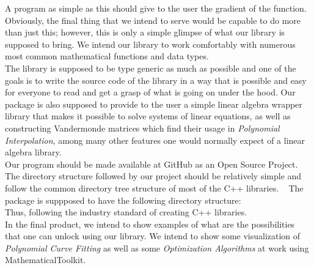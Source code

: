 \documentclass[12pt]{article}
\begin{document}
A program as simple as this should give to the user the gradient of the 
function. Obviously, the final thing that we intend to serve would
be capable to do more than just this; however, this is only a simple glimpse 
of what our library is supposed to bring. We intend our library to 
work comfortably with numerous most common mathematical functions 
and data types.
\\
The library is supposed to be type generic as much as possible and 
one of the goals is to write the source code of the library in a way that
is possible and easy for everyone to read and get a grasp of what is 
going on under the hood.
Our package is also supposed to provide to the user a simple 
linear algebra wrapper library that makes it possible to solve
systems of linear equations, as well as constructing Vandermonde matrices
which find their usage in \emph{Polynomial Interpolation}, among many other
features one would normally expect of a linear algebra library.
\\
Our program should be made available at GitHub as an Open Source Project.
The directory structure followed by our project should be relatively 
simple and follow the common directory tree structure of most of the C++ 
libraries.
\
\newpage
The package is suppposed to have the following directory structure:
\\
Thus, following the industry standard of creating C++ libraries.\\
In the final product, we intend to show examples of what are the possibilities
that one can unlock using our library. We intend to show some 
visualization of \emph{Polynomial Curve Fitting} as well as some \emph{Optimization
Algorithms} at work using MathematicalToolkit.
\end{document}
